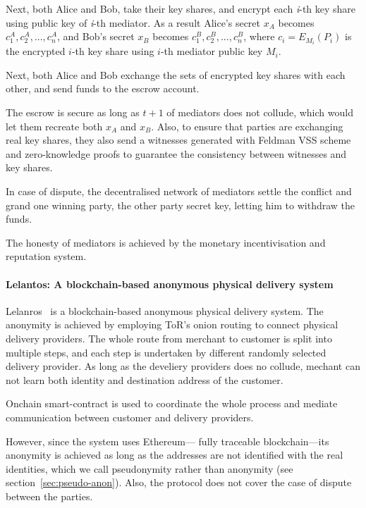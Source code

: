 \documentclass{ieeeaccess}
\begin{document}
Next, both Alice and Bob, take their key shares, and encrypt each
\textit{i}-th key share using public key of \textit{i}-th mediator. As a result
Alice's secret \(x_A\) becomes \({c^A_1, c^A_2,...,c^A_n}\), and Bob's
secret \(x_B\) becomes \({c^B_1, c^B_2,...,c^B_n}\), where
\(c_i = E_{M_i}(P_i)\) is the encrypted \(i\)-th key share using
\(i\)-th mediator public key \(M_i\).

Next, both Alice and Bob exchange the sets of encrypted key shares with
each other, and send funds to the escrow account.

The escrow is secure as long as \(t+1\) of mediators does not collude,
which would let them recreate both \(x_A\) and \(x_B\). Also, to ensure
that parties are exchanging real key shares, they also send a witnesses
generated with Feldman VSS scheme and zero-knowledge proofs to guarantee
the consistency between witnesses and key shares.

In case of dispute, the decentralised network of mediators settle the
conflict and grand one winning party, the other party secret key,
letting him to withdraw the funds.

The honesty of mediators is achieved by the monetary incentivisation and
reputation system.


\paragraph{Lelantos: A blockchain-based anonymous physical delivery system}\label{lelantos-a-blockchain-based-anonymous-physical-delivery-system}

Lelanros~\cite{altawy2017lelantos} is a blockchain-based anonymous
physical delivery system. The anonymity is achieved by employing ToR's
onion routing to connect physical delivery providers. The whole route
from merchant to customer is split into multiple steps, and each step is
undertaken by different randomly selected delivery provider. As long as
the develiery providers does no collude, mechant can not learn both
identity and destination address of the customer.

Onchain smart-contract is used to coordinate the whole process and
mediate communication between customer and delivery providers.

However, since the system uses Ethereum— fully traceable blockchain—its anonymity is achieved as long as the addresses are not identified with the real identities, which we call pseudonymity rather than anonymity (see section~\ref{sec:pseudo-anon}). Also, the protocol does not cover the case of dispute between the parties.
\end{document}
